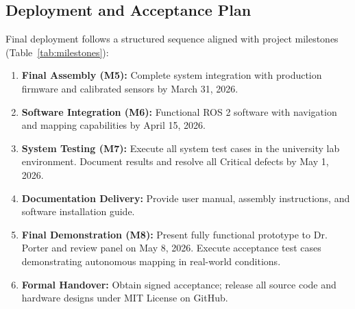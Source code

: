 \subsection{Deployment and Acceptance Plan}

Final deployment follows a structured sequence aligned with project milestones (Table~\ref{tab:milestones}):

\begin{enumerate}
    \item \textbf{Final Assembly (M5):} Complete system integration with production firmware and calibrated sensors by March 31, 2026.
    \item \textbf{Software Integration (M6):} Functional ROS 2 software with navigation and mapping capabilities by April 15, 2026.
    \item \textbf{System Testing (M7):} Execute all system test cases in the university lab environment. Document results and resolve all Critical defects by May 1, 2026.
    \item \textbf{Documentation Delivery:} Provide user manual, assembly instructions, and software installation guide.
    \item \textbf{Final Demonstration (M8):} Present fully functional prototype to Dr. Porter and review panel on May 8, 2026. Execute acceptance test cases demonstrating autonomous mapping in real-world conditions.
    \item \textbf{Formal Handover:} Obtain signed acceptance; release all source code and hardware designs under MIT License on GitHub.
\end{enumerate}

